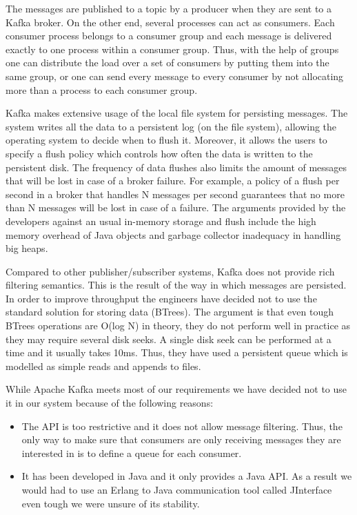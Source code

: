 \documentclass[11pt,a4paper,twoside]{report}
\begin{document}
The messages are published to a topic by a producer when they are sent to a Kafka broker. On the other end, several processes can act as consumers. Each consumer process belongs to a consumer group and each message is delivered exactly to one process within a consumer group. Thus, with the help of groups one can distribute the load over a set of consumers by putting them into the same group, or one can send every message to every consumer by not allocating more than a process to each consumer group.


Kafka makes extensive usage of the local file system for persisting messages. The system writes all the data to a persistent log (on the file system), allowing the operating system to decide when to flush it. Moreover, it allows the users to specify a flush policy which controls how often the data is written to the persistent disk. The frequency of data flushes also limits the amount of messages that will be lost in case of a broker failure. For example, a policy of a flush per second in a broker that handles N messages per second guarantees that no more than N messages will be lost in case of a failure. The arguments provided by the developers against an usual in-memory storage and flush include the high memory overhead of Java objects and garbage collector inadequacy in handling big heaps.


Compared to other publisher/subscriber systems, Kafka does not provide rich filtering semantics. This is the result of the way in which messages are persisted. In order to improve throughput the engineers have decided not to use the standard solution for storing data (BTrees). The argument is that even tough BTrees operations are O(log N) in theory, they do not perform well in practice as they may require several disk seeks. A single disk seek can be performed at a time and it usually takes 10ms. Thus, they have used a persistent queue which is modelled as simple reads and appends to files.


While Apache Kafka meets most of our requirements we have decided not to use it in our system because of the following reasons:

\begin{itemize}
\item{}
The API is too restrictive and it does not allow message filtering. Thus, the only way to make sure that consumers are only receiving messages they are interested in is to define a queue for each consumer.
\item{}
It has been developed in Java and it only provides a Java API. As a result we would had to use an Erlang to Java communication tool called JInterface even tough we were unsure of its stability. 
\end{itemize}
\end{document}
